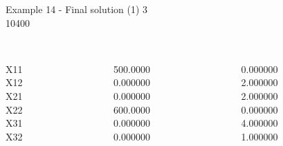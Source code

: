 \begin{frame}{Example 14 - Final solution (1)}
\footnotesize
{}  3\\
  10400\\


\begin{columns}[t]
\begin{column}{0.3\textwidth}

\\
X11\\
X12\\
X21\\
X22\\
X31\\
X32\\
\end{column}
\begin{column}{0.3\textwidth}

\\
500.0000\\
0.000000\\
0.000000\\
600.0000\\
0.000000\\
0.000000\\

\end{column}

\begin{column}{0.3\textwidth}

\\
0.000000\\
2.000000\\
2.000000\\
0.000000\\
4.000000\\
1.000000\\

\end{column}
\end{columns}
\end{frame}


